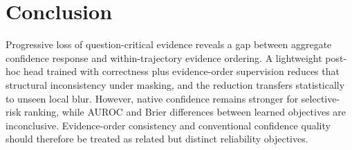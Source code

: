 \section{Conclusion}
\label{sec:conclusion}

Progressive loss of question-critical evidence reveals a gap between aggregate confidence response and within-trajectory evidence ordering. A lightweight post-hoc head trained with correctness plus evidence-order supervision reduces that structural inconsistency under masking, and the reduction transfers statistically to unseen local blur. However, native confidence remains stronger for selective-risk ranking, while AUROC and Brier differences between learned objectives are inconclusive. Evidence-order consistency and conventional confidence quality should therefore be treated as related but distinct reliability objectives.
